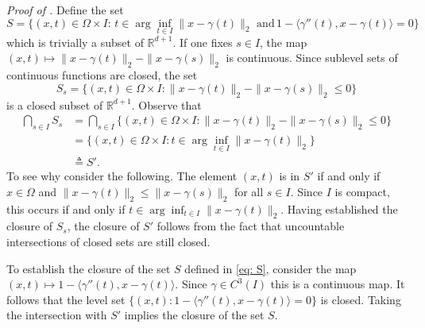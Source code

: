 \documentclass[11pt]{article}
\begin{document}
\textit{Proof of .} Define the set
\begin{equation}
S= \{(x,t) \in \Omega\times I : \, t \in \arg\inf_{t\in I}\|x-\gamma(t)\|_2 \text{ and} \, 1 - \langle\gamma''(t), x - \gamma(t)\rangle = 0\} \label{eq: S}
\end{equation}
which is trivially a subset of $\mathbb{R}^{d+1}$. If one fixes $s \in I$, the map $(x,t) \mapsto \|x-\gamma(t)\|_2 - \|x-\gamma(s)\|_2$ is continuous. Since sublevel sets of continuous functions are closed, the set
\begin{equation}
S_s = \{(x,t) \in \Omega \times I : \|x-\gamma(t)\|_2 - \|x-\gamma(s)\|_2 \leq 0\}
\end{equation}
is a closed subset of $\mathbb{R}^{d+1}$. Observe that
\begin{align*}
    \bigcap_{s \in I} S_s &= \bigcap_{s \in I} \Big\{(x,t) \in \Omega \times I : \|x-\gamma(t)\|_2 - \|x-\gamma(s)\|_2 \leq 0\Big \} \\
    &= \Big\{(x,t)  \in \Omega \times I: t\in \arg\inf_{t\in I}\|x-\gamma(t)\|_2 \Big \} \\
    &\triangleq S'.
\end{align*}
To see why consider the following. The element $(x,t)$ is in $S'$ if and only if $x \in \Omega$ and $\|x - \gamma(t)\|_2  \leq \|x - \gamma(s)\|_2$ for all $s \in I$. Since $I$ is compact, this occurs if and only if $t \in \arg\inf_{t \in I} \|x - \gamma(t)\|_2$. Having established the closure of $S_s$, the closure of $S'$ follows from the fact that uncountable intersections of closed sets are still closed. 

To establish the closure of the set $S$ defined in \cref{eq: S}, consider the map $(x,t) \mapsto 1 - \langle \gamma''(t), x - \gamma(t)\rangle$. Since $\gamma \in C^3(I)$ this is a continuous map. It follows that the level set $\{(x,t) : 1 - \langle \gamma''(t), x - \gamma(t)\rangle = 0\}$ is closed. Taking the intersection with $S'$ implies the closure of the set $S$. 
\end{document}
